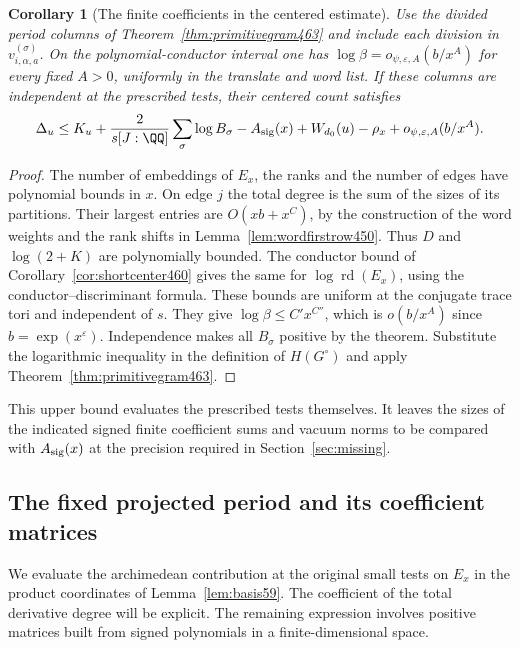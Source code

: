 \documentclass[a4paper,11pt]{article}
\newtheorem{corollary}[proposition]{Corollary}
\theoremstyle{definition}
\theoremstyle{remark}
\numberwithin{equation}{section}
\begin{document}
\begin{corollary}[The finite coefficients in the centered estimate]\leavevmode
\label{cor:fixedheight479}
Use the divided period columns of Theorem~\ref{thm:primitivegram463}
and include each division in \(v_{i,\alpha,a}^{(\sigma)}\).
On the polynomial-conductor interval one has
\(\log\beta=o_{\psi,\varepsilon,A}(b/x^A)\) for every fixed \(A>0\),
uniformly in the translate and word list. If these columns are
independent at the prescribed tests, their centered count satisfies
\[
 \Delta_u\le K_u+\frac{2}{s[J:\QQ]}\sum_\sigma\log B_\sigma
             -A_{\rm sig}(x)+W_{d_0}(u)-\rho_x
             +o_{\psi,\varepsilon,A}(b/x^A).
\]
\end{corollary}
\begin{proof}
The number of embeddings of \(E_x\), the ranks and the number
of edges have polynomial bounds in \(x\). On edge \(j\) the total
degree is the sum of the sizes of its partitions. Their largest
entries are \(O(xb+x^{C})\), by the construction of the word
weights and the rank shifts in Lemma~\ref{lem:wordfirstrow450}.
Thus \(D\) and \(\log(2+K)\) are polynomially bounded. The
conductor bound of Corollary~\ref{cor:shortcenter460} gives the
same for \(\log\operatorname{rd}(E_x)\), using the
conductor--discriminant formula. These bounds are uniform at the
conjugate trace tori and independent of \(s\). They give
\(\log\beta\le C'x^{C''}\), which is \(o(b/x^A)\) since
\(b=\exp(x^\varepsilon)\). Independence makes all \(B_\sigma\)
positive by the theorem. Substitute the logarithmic inequality
in the definition of \(H(G^\circ)\) and apply
Theorem~\ref{thm:primitivegram463}.
\end{proof}

This upper bound evaluates the prescribed tests themselves. It
leaves the sizes of the indicated signed finite coefficient sums
and vacuum norms to be compared with \(A_{\rm sig}(x)\) at the
precision required in Section~\ref{sec:missing}.


\subsection{The fixed projected period and its coefficient matrices}
\label{sec:projectedmatrices489}

We evaluate the archimedean contribution at the original small
tests on \(E_x\) in the product coordinates of
Lemma~\ref{lem:basis59}. The coefficient of the total derivative
degree will be explicit. The remaining expression involves positive
matrices built from signed polynomials in a finite-dimensional
space.
\end{document}
